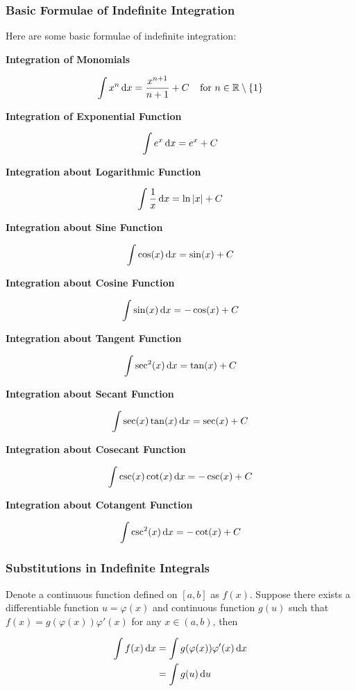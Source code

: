 \documentclass[a4paper,12pt]{article}
\begin{document}
\subsubsection{Basic Formulae of Indefinite Integration}
\begin{pst}
  Here are some basic formulae of indefinite integration:

  \begin{alist}
    \item \textbf{Integration of Monomials}

    $$\int x^{n}\,\mathrm{d} x=\frac{x^{n+1}}{n+1}+C\;\;\;\;\text{for }n\in\mathbb{R}\setminus\left\{ 1\right\}$$

    \item \textbf{Integration of Exponential Function}

    $$\int e^{x}\,\mathrm{d} x=e^{x}+C$$

    \item \textbf{Integration about Logarithmic Function}

    $$\int\frac{1}{x}\,\mathrm{d} x=\ln\left| x\right|+C$$

    \item \textbf{Integration about Sine Function}

    $$\int\cos(x)\,\mathrm{d} x=\sin(x)+C$$

    \item \textbf{Integration about Cosine Function}

    $$\int\sin(x)\,\mathrm{d} x=-\cos(x)+C$$

    \item \textbf{Integration about Tangent Function}

    $$\int\sec^{2}(x)\,\mathrm{d} x=\tan(x)+C$$

    \item \textbf{Integration about Secant Function}

    $$\int\sec(x)\tan(x)\,\mathrm{d} x=\sec(x)+C$$

    \item \textbf{Integration about Cosecant Function}

    $$\int\csc(x)\cot(x)\,\mathrm{d} x=-\csc(x)+C$$

    \item \textbf{Integration about Cotangent Function}

    $$\int\csc^{2}(x)\,\mathrm{d} x=-\cot(x)+C$$
  \end{alist}
\end{pst}

\subsubsection{Substitutions in Indefinite Integrals}
\begin{thm}
  Denote a continuous function defined on $[a,b]$ as $f(x)$. Suppose there exists a differentiable function $u=\varphi(x)$ and continuous function $g(u)$ such that $f(x)=g(\varphi(x))\varphi'(x)$ for any $x\in(a,b)$, then

  $$\begin{aligned}[t]
    \int f(x)\,\mathrm{d} x&=\int g(\varphi(x))\varphi'(x)\,\mathrm{d} x\\
    &=\int g(u)\,\mathrm{d} u
  \end{aligned}$$
\end{thm}
\end{document}
